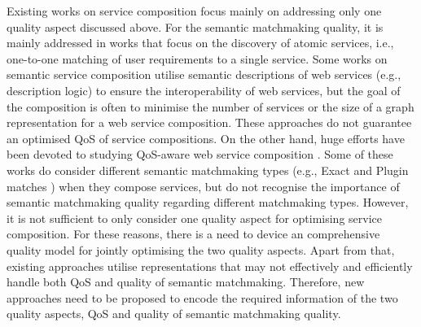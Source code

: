 Existing works on service composition focus mainly on addressing only one quality aspect discussed above. For the semantic matchmaking quality, it is mainly addressed in works that focus on the discovery of atomic services, i.e., one-to-one matching of user requirements to a single service. Some works \cite{bansal2016generalized,boustil2014semantic,mier2015integrated} on semantic service composition utilise semantic descriptions of web services (e.g., description logic) to ensure the interoperability of web services, but the goal of the composition is often to minimise the number of services or the size of a graph representation for a web service composition. These approaches do not guarantee an optimised QoS of service compositions. On the other hand, huge efforts have been devoted to studying QoS-aware web service composition \cite{da2015graphevol,da2016particle,gupta2015optimization,ma2015hybrid,qi2010combining,yu2013adaptive}. Some of these works do consider different semantic matchmaking types (e.g., Exact and Plugin matches \cite{paolucci2002semantic}) when they compose services, but do not recognise the importance of semantic matchmaking quality regarding different matchmaking types. However, it is not sufficient to only consider one quality aspect for optimising service composition. For these reasons, there is a need to device an comprehensive quality model for jointly optimising the two quality aspects. Apart from that, existing approaches utilise representations that may not effectively and efficiently handle both QoS and quality of semantic matchmaking. Therefore, new approaches need to be proposed to encode the required information of the two quality aspects, QoS and quality of semantic matchmaking quality. 


